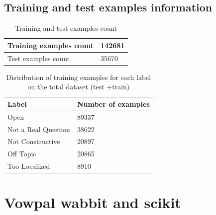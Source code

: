 \documentclass[letterpaper,twocolumn,11pt]{article}
\begin{document}

\subsection{Training and test examples information}


\begin{table}[h]
	\centering
	\begin{tabular}{ |p{4cm}|p{2cm} |}
		\hline
		Training examples count		&	142681\\  \hline
		Test examples count &	35670 \\  \hline
		
	\end{tabular}
	\caption{Training and test examples count} 
	\label{tab:dist1} 
\end{table} 



\begin{table}[ht]
	\begin{tabular}{ |p{3.5cm}|p{3.5cm} |}
		\hline
		\textbf {Label} & \textbf{Number of examples}\\ \hline
		Open		&	89337\\  \hline
		Not a Real Question	&	38622 \\  \hline
		Not Constructive	&	20897 \\  \hline
		Off Topic		&	20865\\  \hline
		Too Localized		&	8910\\  \hline
		
	\end{tabular}
	\caption{Distribution of training examples for each label on the total dataset (test +train)} 
	\label{tab:dist} 
\end{table} 


\section{Vowpal wabbit and scikit}
\end{document}
